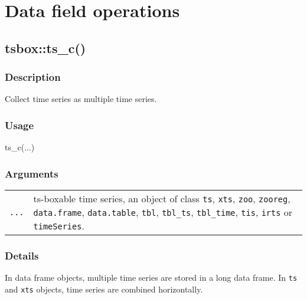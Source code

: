 \documentclass[
  letterpaper,
  DIV=11,
  numbers=noendperiod]{scrreport}
\newenvironment{Shaded}{\begin{snugshade}}{\end{snugshade}}
\newcommand{\FunctionTok}[1]{\textcolor[rgb]{0.28,0.35,0.67}{#1}}
\newcommand{\NormalTok}[1]{\textcolor[rgb]{0.00,0.23,0.31}{#1}}
\begin{document}
\section{Data field operations}\label{sec-field}

\subsection{tsbox::ts\_c()}\label{tsboxts_c}

\subsubsection{Description}\label{description-55}

Collect time series as multiple time series.

\subsubsection{Usage}\label{usage-55}

\begin{Shaded}
\begin{Highlighting}[]
\FunctionTok{ts\_c}\NormalTok{(...)}
\end{Highlighting}
\end{Shaded}

\subsubsection{Arguments}\label{arguments-55}

\begin{longtable}[]{@{}ll@{}}
\toprule\noalign{}
\endhead
\bottomrule\noalign{}
\endlastfoot
\texttt{...} & ts-boxable time series, an object of class \texttt{ts},
\texttt{xts}, \texttt{zoo}, \texttt{zooreg}, \texttt{data.frame},
\texttt{data.table}, \texttt{tbl}, \texttt{tbl\_ts}, \texttt{tbl\_time},
\texttt{tis}, \texttt{irts} or \texttt{timeSeries}. \\
\end{longtable}

\subsubsection{Details}\label{details-17}

In data frame objects, multiple time series are stored in a long data
frame. In \texttt{ts} and \texttt{xts} objects, time series are combined
horizontally.
\end{document}
